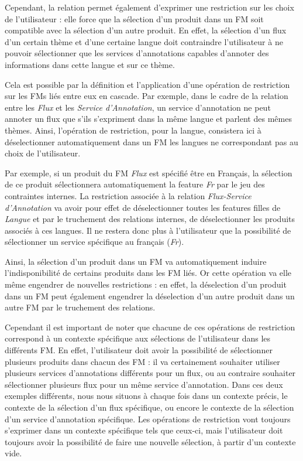 \documentclass[]{easychair}
\newcommand{\comment}[4]{\par\noindent\hspace*{-0.5cm}{\parbox{\columnwidth}{\textbf{\color{#1}//#2[#3]:#4}}}\par}
\newcommand{\ch}[1]{\comment{green}{}{#1}{CH}}
\begin{document}
Cependant, la relation permet également d'exprimer une restriction sur les choix de l'utilisateur : elle force que la sélection d'un produit dans un FM soit compatible avec la sélection d'un autre produit. En effet, la sélection d'un flux d'un certain thème et d'une certaine langue doit contraindre l'utilisateur à ne pouvoir sélectionner que les services d'annotations capables d'annoter des informations dans cette langue et sur ce thème. 

Cela est possible par la définition et l'application d'une opération de restriction sur les FMs liés entre eux en cascade. Par exemple, dans le cadre de la relation entre les \textit{Flux} et les \textit{Service d'Annotation}, un service d'annotation ne peut annoter un flux que s'ils s'expriment dans la même langue et parlent des mêmes thèmes. Ainsi, l'opération de restriction, pour la langue, consistera ici à déselectionner automatiquement dans un FM les langues ne correspondant pas au choix de l'utilisateur. 

Par exemple, si un produit du FM \textit{Flux} est spécifié être en Français, la sélection de ce produit sélectionnera automatiquement la feature \textit{Fr} par le jeu des contraintes internes. La restriction associée à la relation \textit{Flux-Service d'Annotation} va avoir pour effet de déselectionner toutes les features filles de \textit{Langue} et par le truchement des relations internes, de déselectionner les produits associés à ces langues. Il ne restera donc plus à l'utilisateur que la possibilité de sélectionner un service spécifique au français (\textit{Fr}).


Ainsi, la sélection d'un produit dans un FM va automatiquement induire l'indisponibilité de certains produits dans les FM liés. Or cette opération va elle même engendrer de nouvelles restrictions : en effet, la déselection d'un produit dans un FM peut également engendrer la déselection d'un autre produit dans un autre FM par le truchement des relations. 
\ch{parler certainement de la notion de cascade ici}
Cependant il est important de noter que chacune de ces opérations de restriction correspond à un contexte spécifique aux sélections de l'utilisateur dans les différents FM. En effet, l'utilisateur doit avoir la possibilité de sélectionner plusieurs produits dans chacun des FM : il va certainement souhaiter utiliser plusieurs services d'annotations différents pour un flux, ou au contraire souhaiter sélectionner plusieurs flux pour un même service d'annotation. Dans ces deux exemples différents, nous nous situons à chaque fois dans un contexte précis, le contexte de la sélection d'un flux spécifique, ou encore le contexte de la sélection d'un service d'annotation spécifique. Les opérations de restriction vont toujours s'exprimer dans un contexte spécifique tels que ceux-ci, mais l'utilisateur doit toujours avoir la possibilité de faire une nouvelle sélection, à partir d'un contexte vide. 
\end{document}
